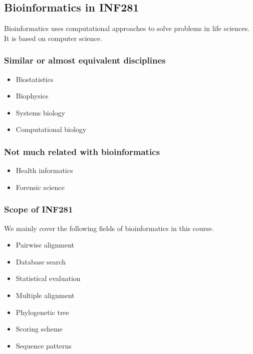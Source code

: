 %
%

%
%
\subsection{Bioinformatics in INF281}
Bioinformatics uses computational approaches to solve problems in life sciences. It is based on computer science.

%
%
\subsubsection*{Similar or almost equivalent disciplines}
\begin{itemize}
\item Biostatistics
\item Biophysics
\item Systems biology
\item Computational biology
\end{itemize}

%
%
\subsubsection*{Not much related with bioinformatics}
\begin{itemize}
\item Health informatics
\item Forensic science
\end{itemize}

%
%
\subsubsection*{Scope of INF281}
We mainly cover the following fields of bioinformatics in this course.
\begin{itemize}
\item Pairwise alignment
\item Database search
\item Statistical evaluation
\item Multiple alignment
\item Phylogenetic tree
\item Scoring scheme
\item Sequence patterns
\end{itemize}

